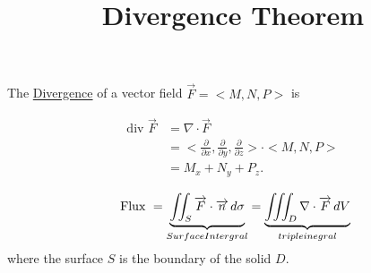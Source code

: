\documentclass{ximera}
\title[Dig-In:]{Divergence Theorem}
\begin{document}
\begin{abstract}
\end{abstract}
\maketitle

The \underline{Divergence} of a vector field $\overrightarrow{F} = <M, N, P>$ is

\begin{align*}
\text{div }\overrightarrow{F} &= \nabla \cdot \overrightarrow{F} \\
&= <\frac{\partial}{\partial x}, \frac{\partial}{\partial y}, \frac{\partial}{\partial z}> \cdot <M,N,P> \\
&= M_x + N_y + P_z.
\end{align*}


\begin{theorem}
\[
\text{ Flux } = \underbrace{\iint_S \overrightarrow{F} \cdot \overrightarrow{n} \mathop{}\!d \sigma}_{Surface Intergral}
= \underbrace{\iiint_D \nabla\cdot \overrightarrow{F} \mathop{}\!d V}_{triple inegral}
\]
where the surface $S$ is the boundary of the solid $D$.
\end{theorem}
\end{document}
